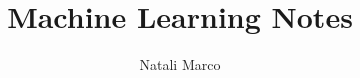 \documentclass[11pt]{book}
\theoremstyle{definition}%
\begin{document}
    \title{Machine Learning Notes}
    \author{Natali Marco}
    \date{}

    \maketitle
    \tableofcontents
    \listoffigures
    
\end{document}
